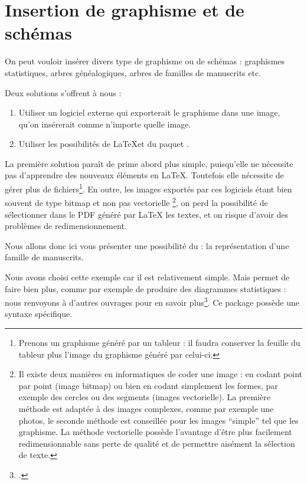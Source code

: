 \section{Insertion de graphisme et de schémas}

On peut vouloir insérer divers type de graphisme ou de schémas : graphismes statistiques, arbres généalogiques, arbres de familles de manuscrits etc.

Deux solutions s'offrent à nous :
\begin{enumerate}
\item Utiliser un logiciel externe qui exporterait le graphisme dans une image, qu'on insérerait comme n'importe quelle image.
\item Utiliser les possibilités de \LaTeX et du paquet .
\end{enumerate}

La première solution paraît de prime abord plus simple, puisqu'elle ne nécessite pas d'apprendre des nouveaux éléments en \LaTeX. Toutefois elle nécessite de gérer plus de fichiers\footnote{Prenons un graphisme généré par un tableur : il faudra conserver la feuille du tableur plus l'image du graphisme généré par celui-ci.}. En outre, les images exportés par ces logiciels étant bien souvent de type bitmap et non pas vectorielle%
\footnote{Il existe deux manières en informatiques de coder une image : en codant point par point (image bitmap) ou bien en codant simplement les formes, par exemple des cercles ou des segments (images vectorielle). La première méthode est adaptée à des images complexes, comme par exemple une photos,  le seconde méthode est conseillée pour les images \enquote{simple} tel que les graphisme. La méthode vectorielle possède l'avantage d'être plus facilement redimensionnable  sans perte de qualité et de permettre aisément la sélection de texte.},
on perd la possibilité de sélectionner dans le PDF généré par LaTeX les textes, et on risque d'avoir des problèmes de redimensionnement.

Nous allons donc ici vous présenter une possibilité du  : la représentation d'une famille de manuscrits. 

Nous avons choisi cette exemple car il est relativement simple. Mais  permet de faire bien plus, comme par exemple de produire des diagrammes statistiques : nous renvoyons à d'autres ouvrages pour en savoir plus\footcites[Outre le manuel on pourra lire][]{tikzimpatient}[on pourra également consulter le site ][]{tikzexample}.
Ce package possède une syntaxe spécifique. 


